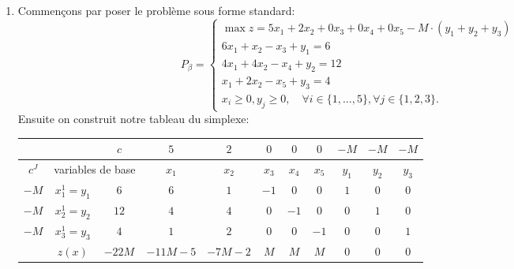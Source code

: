 \begin{td-sol}[]\ %
    \begin{enumerate}
        \item Commençons par poser le problème sous forme standard:
        \begin{equation*}
            P_\beta =
            \begin{cases}
                \max z = 5x_1 + 2x_2 + 0x_3 + 0x_4 + 0x_5 - M\cdot(y_1 + y_2 + y_3)\\
                6x_1 + x_2 - x_3 + y_1 = 6\\
                4x_1 + 4x_2 - x_4 + y_2 = 12\\
                x_1 + 2x_2 - x_5 + y_3 = 4\\
                x_i\geq 0, y_j \geq 0,\quad \forall i \in \{1,\ldots,5\}, \forall j \in \{1,2,3\}.
            \end{cases}
        \end{equation*}
        Ensuite on construit notre tableau du simplexe:
        \begin{center}
            \begin{tabular}{|ccc|cccccccc|} %
                \hline  %
                & \ &\(c\)&\(5\)&\(2\)&\(0\)&\(0\)&\(0\)&\(-M\)&\(-M\)&\(-M\)\\
                \hline %
                \multicolumn{1}{|c|}{\(c^J\)}& \multicolumn{2}{c|}{variables de base}&\(x_1\)&\(x_2\)&\(x_3\)&\(x_4\)&\(x_5\)&\(y_1\)&\(y_2\)&\(y_3\)\\
                \hline %
                \multicolumn{1}{|c|}{\(-M\)}& \multicolumn{1}{c|}{\(x_1^{1}=y_1\)} &\(6\)&\(6\)&\(1\)&\(-1\)&\(0\)&\(0\)&\(1\)&\(0\)&\(0\)\\
                \hline %
                \multicolumn{1}{|c|}{\(-M\)}& \multicolumn{1}{c|}{\(x_2^{1}=y_2\)} &\(12\)&\(4\)&\(4\)&\(0\)&\(-1\)&\(0\)&\(0\)&\(1\)&\(0\)\\
                \hline %
                \multicolumn{1}{|c|}{\(-M\)}& \multicolumn{1}{c|}{\(x_3^{1}=y_3\)} &\(4\)&\(1\)&\(2\)&\(0\)&\(0\)&\(-1\)&\(0\)&\(0\)&\(1\)\\
                \hline %
                \multicolumn{1}{|c|}{} &\(z(x)\)& \multicolumn{1}{|c|}{\(-22M\)} &\(-11M-5\)&\(-7M-2\)&\(M\)&\(M\)&\(M\)&\(0\)&\(0\)&\(0\)\\
                \hline %
            \end{tabular}
        \end{center}

\end{enumerate}
\end{td-sol}
